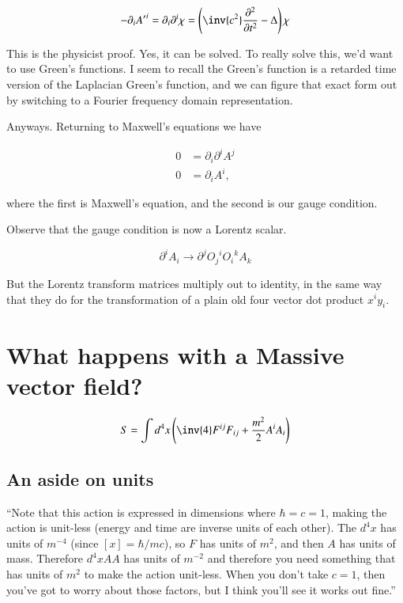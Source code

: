 \begin{equation}\label{eqn:relativisticElectrodynamicsL14:510}
-\partial_i {A'}^i = \partial_i \partial^i \chi = \left( \inv{c^2} \frac{\partial^2}{\partial t^2} - \Delta \right) \chi
\end{equation}

This is the physicist proof.  Yes, it can be solved.  To really solve this, we'd want to use Green's functions.  I seem to recall the Green's function is a retarded time version of the Laplacian Green's function, and we can figure that exact form out by switching to a Fourier frequency domain representation.

Anyways.  Returning to Maxwell's equations we have

\begin{align}\label{eqn:relativisticElectrodynamicsL14:530}
0 &= \partial_i \partial^i A^j \\
0 &= \partial_i A^i ,
\end{align}

where the first is Maxwell's equation, and the second is our gauge condition.

Observe that the gauge condition is now a Lorentz scalar.

\begin{equation}\label{eqn:relativisticElectrodynamicsL14:550}
\partial^i A_i \rightarrow \partial^j {O_j}^i {O_i}^k A_k
\end{equation}

But the Lorentz transform matrices multiply out to identity, in the same way that they do for the transformation of a plain old four vector dot product $x^i y_i$.

\section{What happens with a Massive vector field?}

\begin{equation}\label{eqn:relativisticElectrodynamicsL14:570}
S = \int d^4 x \left( \inv{4} F^{ij} F_{ij} + \frac{m^2}{2} A^i A_i \right)
\end{equation}

\subsection{An aside on units}

``Note that this action is expressed in dimensions where $\hbar = c = 1$, making the action is unit-less (energy and time are inverse units of each other).  The $d^4x$ has units of $m^{-4}$ (since $[x] = \hbar/mc$), so $F$ has units of $m^2$, and then $A$ has units of mass. Therefore $d^4x A A$ has units of $m^{-2}$ and therefore you need something that has units of $m^2$ to make the action unit-less. When you don't take $c=1$, then you've got to worry about those factors, but I think you'll see it works out fine.''

